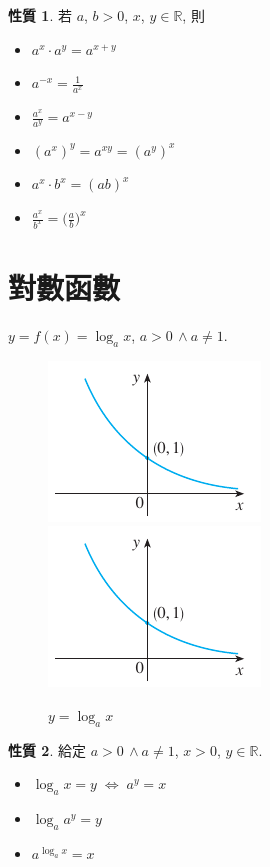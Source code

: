 \documentclass[12pt,a4paper]{extarticle}
\newcommand{\ds}{\displaystyle}
\newcommand{\ifff}{\;\Longleftrightarrow\;}
\theoremstyle{definition}
\newtheorem*{prp}{性質}
\begin{document}
\begin{prp} 若 $a$, $b > 0$, $x$, $y\in\mathbb{R}$, 則
  \setlength{\columnsep}{-0mm}
  \begin{multicols}{3}
    \begin{itemize}\setlength\itemsep{0em}
      \item $\ds a^x\cdot a^y = a^{x + y}$
      \item $\ds a^{-x} = \frac{1}{a^x}$
      \item $\ds\frac{a^x}{a^y} = a^{x - y}$
      \item $\ds (a^x)^y = a^{xy} = (a^y)^x$
      \item $\ds a^x\cdot b^x = (ab)^x$
      \item $\ds\frac{a^x}{b^x} = \Big(\frac{a}{b}\Big)^x$
    \end{itemize}
  \end{multicols}
\end{prp}

\section*{對數函數}

$y = f(x) = \log_a x$, $a > 0\,\wedge a\not=1$. 

\begin{figure}[!htbp]
  \centering
  \includegraphics[scale=1.,page=3]{fig/power.pdf}\qquad\qquad
  \includegraphics[scale=1.,page=4]{fig/power.pdf}
  \caption{$y = \log_a x$}
\end{figure}

\begin{prp} 給定 $a > 0\,\wedge a\not=1$, $x > 0$, $y\in\mathbb{R}$. 
  \setlength{\columnsep}{-0mm}
  \begin{multicols}{3}
    \begin{itemize}\setlength\itemsep{0em}
      \item $\log_a x = y \ifff a^y = x$
      \item $\ds\log_a a^y = y$
      \item $\ds a^{\log_a x} = x$
    \end{itemize}
  \end{multicols}
\end{prp}
\end{document}
